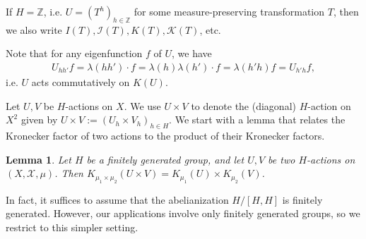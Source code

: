 \documentclass[11pt]{amsart}
\newtheorem{lemma}{Lemma}[section]
\theoremstyle{definition}
\newcommand{\Z}{{\mathbb Z}}
\newcommand{\CI}{{\mathcal I}}
\newcommand{\CK}{{\mathcal K}}
\newcommand{\CX}{{\mathcal X}}
\newcommand{\1}{{\mathbf{1}}}
\begin{document}
If $H=\Z$, i.e. $U = (T^h)_{h\in\Z}$ for some measure-preserving transformation $T$, then we also write $I(T), \CI(T), K(T), \CK(T)$, etc.

Note that for any eigenfunction $f$ of $U$, we have
\begin{align}\label{E: commutativity on Kronecker}
    U_{hh'}f = \lambda(hh')\cdot f = \lambda(h)\lambda(h')\cdot f = \lambda(h'h)f = U_{h'h}f,
\end{align}
i.e. $U$ acts commutatively on $K(U)$. 

{Let $U,V$ be $H$-actions on $X$. We use $U\times V$ to denote the (diagonal) $H$-action on $X^{2}$ given by $U\times V:=(U_{h}\times V_{h})_{h\in H}$.}
We start with a lemma that relates the Kronecker factor of two actions to the product of their Kronecker factors. 
\begin{lemma}\label{L: product of Kroneckers}
    Let $H$ be a finitely generated group, and let $U,V$ be two $H$-actions on $(X, \CX, \mu)$. Then $K_{\mu_{1}\times\mu_{2}}(U\times V) = K_{\mu_{1}}(U)\times K_{\mu_{2}}(V)$.
\end{lemma}
In fact, it suffices to assume that the abelianization $H/[H,H]$ is finitely generated. However, our applications involve only finitely generated groups, so we restrict to this simpler setting.
\end{document}
